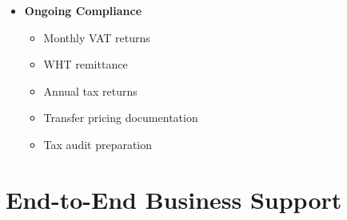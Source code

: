 \begin{tcolorbox}[
    colback=white,
    colframe=primarydark,
    title=\textbf{Federal Inland Revenue Service (FIRS) Requirements},
    before skip=1em,
    after skip=1em
]
\begin{itemize}[leftmargin=*,itemsep=0.5em]
        \vspace{0.5em}

        \item \textbf{Ongoing Compliance}
        \begin{itemize}[itemsep=0.3em]
            \item Monthly VAT returns
            \item WHT remittance
            \item Annual tax returns
            \item Transfer pricing documentation
            \item Tax audit preparation
        \end{itemize}
    \end{itemize}
\end{tcolorbox}

\vspace{2em}


\section{End-to-End Business Support}\label{sec:business-support}
\vspace{1em}

